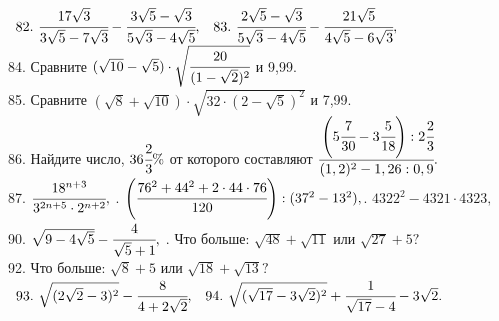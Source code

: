 $\begin{array}{ll}
82.\ \cfrac{17\sqrt{3}}{3\sqrt{5}-7\sqrt{3}}-\cfrac{3\sqrt{5}-\sqrt{3}}{5\sqrt{3}-4\sqrt{5}},&
83.\ \cfrac{2\sqrt{5}-\sqrt{3}}{5\sqrt{3}-4\sqrt{5}}-\cfrac{21\sqrt{5}}{4\sqrt{5}-6\sqrt{3}},
\end{array}$\\
84. Сравните $(\sqrt{10}-\sqrt{5})\cdot\sqrt{\cfrac{20}{(1-\sqrt{2})^2}}$ и 9,99.\\
85. Сравните $(\sqrt{8}+\sqrt{10})\cdot\sqrt{32\cdot(2-\sqrt{5})^2}$ и 7,99.\\
86. Найдите число, $36\cfrac{2}{3}\%$ от которого составляют
$\cfrac{\left(5\cfrac{7}{30}-3\cfrac{5}{18}\right):2\cfrac{2}{3}}{(1,2)^2-1,26:0,9}.$\\
87. $\cfrac{18^{n+3}}{3^{2n+5}\cdot2^{n+2}},$ . $\left(\cfrac{76^2+44^2+2\cdot44\cdot76}{120}\right):(37^2-13^2),$. $4322^2-4321\cdot4323,$ \\ 90. $\sqrt{9-4\sqrt{5}}-\cfrac{4}{\sqrt{5}+1},$ \qquad {}. Что больше: $\sqrt{48}+\sqrt{11}$ или $\sqrt{27}+5?$ \\
92. Что больше: $\sqrt{8}+5$ или $\sqrt{18}+\sqrt{13}?$\\
$\begin{array}{ll}
93.\ \sqrt{(2\sqrt{2}-3)^2}-\cfrac{8}{4+2\sqrt{2}},&
94.\ \sqrt{(\sqrt{17}-3\sqrt{2})^2}+\cfrac{1}{\sqrt{17}-4}-3\sqrt{2}.
\end{array}$
\newpage
